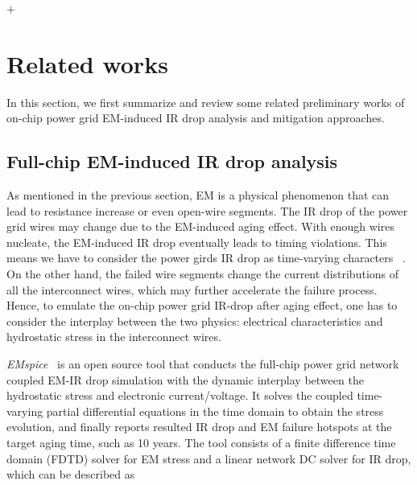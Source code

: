 +\section{Related works}
\label{sec:related}

In this section, we first summarize and review some related preliminary works of on-chip power grid EM-induced IR drop analysis and mitigation approaches.

\subsection{Full-chip EM-induced IR drop analysis}
\label{subsec:emspice}
As mentioned in the previous section, EM is a physical phenomenon that can lead to resistance increase or even open-wire segments.  The IR drop of the power grid wires may change due to the EM-induced aging effect. With enough wires nucleate, the EM-induced IR drop eventually leads to timing violations. This means we have to consider the power girds IR drop as time-varying characters ~\cite{SunYu:TDMR'20, Huang:TCAD'15, Chatterjee:2018TCAD,SukharevNajm:2018TDMR}. 
On the other hand, the failed wire segments change the current distributions of all the interconnect wires, which may further accelerate the failure process. Hence, to emulate the on-chip power grid IR-drop after aging effect, one has to consider the interplay between the two physics: electrical characteristics and hydrostatic stress in the interconnect wires.

{\it EMspice}~\cite{SunYu:TDMR'20,EMspiceSourceCode} is an open source tool that conducts the full-chip power grid network coupled EM-IR drop simulation with the dynamic interplay between the hydrostatic stress and electronic current/voltage. It solves the coupled time-varying partial differential equations in the time domain to obtain the stress evolution, and finally reports resulted IR drop and EM failure hotspots at the target aging time, such as 10 years.  The tool consists of a finite difference time domain (FDTD) solver for EM stress and a linear network DC solver for IR drop, which can be described as



